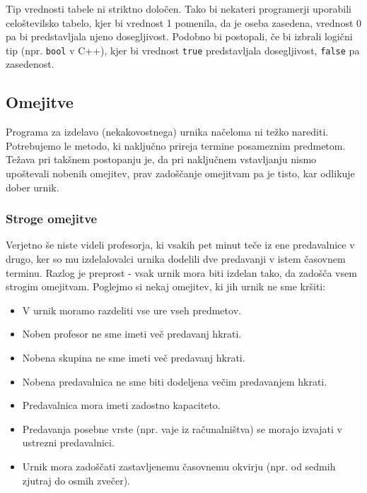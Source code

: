 \documentclass[a4paper,10pt]{article}
\begin{document}
Tip vrednosti tabele ni striktno določen. Tako bi nekateri programerji uporabili
celoštevilsko tabelo, kjer bi vrednost 1 pomenila, da je oseba zasedena, vrednost 0
pa bi predstavljala njeno dosegljivost. Podobno bi postopali, če bi izbrali logični
tip (npr. \texttt{bool} v C++), kjer bi vrednost \texttt{true} predstavljala
dosegljivost, \texttt{false} pa zasedenost.

\subsection{Omejitve} %

Programa za izdelavo (nekakovostnega) urnika načeloma ni težko narediti. Potrebujemo
le metodo, ki naključno prireja termine posameznim predmetom. Težava pri takšnem postopanju
je, da pri naključnem vstavljanju nismo upoštevali nobenih omejitev, prav zadoščanje omejitvam
pa je tisto, kar odlikuje dober urnik.

\subsubsection{Stroge omejitve} %

Verjetno še niste videli profesorja, ki vsakih pet minut teče iz ene predavalnice v drugo,
ker so mu izdelalovalci urnika dodelili dve predavanji v istem časovnem terminu. Razlog
je preprost - vsak urnik mora biti izdelan tako, da zadošča vsem strogim omejitvam.
Poglejmo si nekaj omejitev, ki jih urnik ne sme kršiti:

\begin{itemize}
   
   \item V urnik moramo razdeliti vse ure vseh predmetov.
   \item Noben profesor ne sme imeti več predavanj hkrati.
   \item Nobena skupina ne sme imeti več predavanj hkrati.
   \item Nobena predavalnica ne sme biti dodeljena večim predavanjem hkrati.
   \item Predavalnica mora imeti zadostno kapaciteto.
   \item Predavanja posebne vrste (npr. vaje iz računalništva) se morajo izvajati v ustrezni predavalnici.
   \item Urnik mora zadoščati zastavljenemu časovnemu okvirju (npr. od sedmih zjutraj do osmih zvečer).
\end{itemize}
\end{document}
